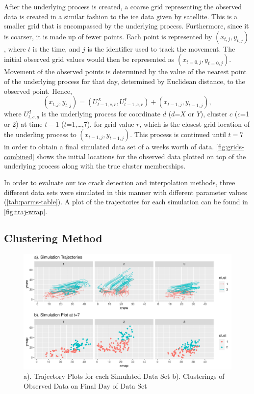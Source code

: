 \documentclass[12pt]{article}
\begin{document}
After the underlying process is created, a coarse grid representing the
observed data is created in a similar fashion to the ice data given by
satellite. This is a smaller grid that is encompassed by the underlying
process. Furthermore, since it is coarser, it is made up of fewer
points. Each point is represented by \((x_{t,j}, y_{t,j})\), where \(t\)
is the time, and \(j\) is the identifier used to track the movement. The
initial observed grid values would then be represented as
\((x_{t=0,j}, y_{t=0,j})\). Movement of the observed points is
determined by the value of the nearest point of the underlying process
for that day, determined by Euclidean distance, to the observed point.
Hence,
\[(x_{t,j}, y_{t,j}) = (U^{X}_{t-1,c,r}, U^{Y}_{t-1,c,r}) + (x_{t-1,j}, y_{t-1,j}),\]
where \(U^d_{t,c,g}\) is the underlying process for coordinate \(d\)
(\(d\)=\(X\) or \(Y\)), cluster \(c\) (\(c\)=1 or 2) at time \(t-1\)
(\(t\)=1,\ldots,7), for grid value \(r\), which is the closest grid
location of the underling process to \((x_{t-1,j}, y_{t-1,j})\). This
process is continued until \(t=7\) in order to obtain a final simulated
data set of a weeks worth of data. \cref{fig:grids-combined} shows the
initial locations for the observed data plotted on top of the underlying
process along with the true cluster memberships.

In order to evaluate our ice crack detection and interpolation methods,
three different data sets were simulated in this manner with different
parameter values (\cref{tab:parms-table}). A plot of the trajectories
for each simulation can be found in \cref{fig:traj-wrap}.

\hypertarget{clustering-method}{%
\subsection{Clustering Method}\label{clustering-method}}

\begin{figure}[tbp]

{\centering \includegraphics[width=\linewidth,]{spatio-temporal-model-arctic-sea-ice_files/figure-latex/all-combine-1} 

}

\caption{a). Trajectory Plots for each Simulated Data Set b). Clusterings of Observed Data on Final Day of Data Set}\label{fig:all-combine}
\end{figure}
\end{document}
